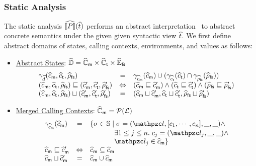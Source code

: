 \subsubsection{Static Analysis}

The static analysis $\widehat{\llbracket{P}\rrbracket}(\widehat{t})$ performs an abstract
interpretation~\cite{ai1977, ai1992} to abstract concrete semantics under the
given given syntactic view $\widehat{t}$.  We first define abstract domains of
states, calling contexts, environments, and values as follows:
\begin{itemize}
  \item \underline{Abstract States}:
    $\widehat{\mathbb{D}} = \widehat{\mathbb{C}}_{\textsf{m}} \times \widehat{\mathbb{C}}_{\textsf{t}} \times \widehat{\mathbb{E}}_{\textsf{fs}}$
    \[
      \begin{array}{lcl}
        \gamma_{\widehat{d}}(\widehat{c}_{\textsf{m}}, \widehat{c}_{\textsf{t}}, \widehat{\rho}_{\textsf{fs}}) &=&
        \gamma_{\widehat{c}_{\textsf{m}}}(\widehat{c}_{\textsf{m}}) \cup
        (\gamma_{\widehat{c}_{\textsf{t}}}(\widehat{c}_{\textsf{t}}) \cap \gamma_{\widehat{\rho}_{\textsf{fs}}}(\widehat{\rho}_{\textsf{fs}}))\\

        (\widehat{c}_{\textsf{m}}, \widehat{c}_{\textsf{t}}, \widehat{\rho}_{\textsf{fs}}) \sqsubseteq
        (\widehat{c}_{\textsf{m}}', \widehat{c}_{\textsf{t}}', \widehat{\rho}_{\textsf{fs}}') &\Leftrightarrow&
        (\widehat{c}_{\textsf{m}} \sqsubseteq \widehat{c}_{\textsf{m}}') \wedge
        (\widehat{c}_{\textsf{t}} \sqsubseteq \widehat{c}_{\textsf{t}}') \wedge
        (\widehat{\rho}_{\textsf{fs}} \sqsubseteq \widehat{\rho}_{\textsf{fs}}')\\

        (\widehat{c}_{\textsf{m}}, \widehat{c}_{\textsf{t}}, \widehat{\rho}_{\textsf{fs}}) \sqcup (\widehat{c}_{\textsf{m}}', \widehat{c}_{\textsf{t}}', \widehat{\rho}_{\textsf{fs}}') &=&
        (\widehat{c}_{\textsf{m}} \sqcup \widehat{c}_{\textsf{m}}', \widehat{c}_{\textsf{t}} \sqcup \widehat{c}_{\textsf{t}}', \widehat{\rho}_{\textsf{fs}} \sqcup \widehat{\rho}_{\textsf{fs}}')\\
      \end{array}
    \]

  \item \underline{Merged Calling Contexts}:
    $\widehat{\mathbb{C}}_{\textsf{m}} = \mathcal{P}(\mathcal{L})$
    \[
      \begin{array}{lcl}
        \amctxtgamma(\amctxt) &=& \{ \st \in \stset \mid
          \st = (\lab, [\ctxt_1, \cdots, \ctxt_n], \_, \_) \wedge\\&&

          \phantom{\{ \st \in \stset \mid}
          \exists 1 \leq j \leq n. \; \ctxt_j = (\lab_j, \_, \_) \wedge\\&&

          \phantom{\{ \st \in \stset \mid}
          \lab_j \in \amctxt
        \}\\

        \amctxt \order \amctxt' &\Leftrightarrow&
        \amctxt \subseteq \amctxt\\

        \amctxt \join \amctxt' &=&
        \amctxt \cup \amctxt\\
      \end{array}
    \]


\end{itemize}
